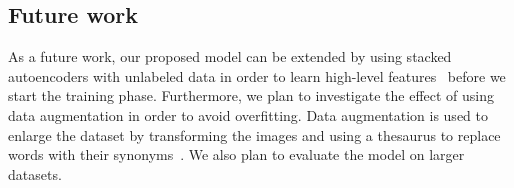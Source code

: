 \documentclass{article} %
\begin{document}
\subsection{Future work}
As a future work, our proposed model can be extended by using stacked autoencoders with unlabeled data in order to learn high-level features~\cite{icml_unsupervised} before we start the training phase. Furthermore, we plan to investigate the effect of using data augmentation in order to avoid overfitting. Data augmentation is used to enlarge the dataset by transforming the images and using a thesaurus to replace words with their synonyms~\cite{icml_unsupervised, nips_text}. We also plan to evaluate the model on larger datasets.

%
%
%
%
%
%
%
\printbibliography
\clearpage
\end{document}

